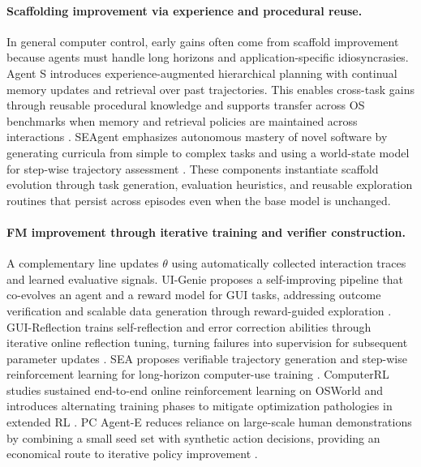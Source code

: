 \documentclass{article}
\begin{document}
\paragraph{Scaffolding improvement via experience and procedural reuse.}
In general computer control, early gains often come from scaffold improvement because agents must handle long horizons and application-specific idiosyncrasies. Agent S introduces experience-augmented hierarchical planning with continual memory updates and retrieval over past trajectories. This enables cross-task gains through reusable procedural knowledge and supports transfer across OS benchmarks when memory and retrieval policies are maintained across interactions \citep{agashe2024agentsopenagentic}. SEAgent emphasizes autonomous mastery of novel software by generating curricula from simple to complex tasks and using a world-state model for step-wise trajectory assessment \citep{sun2025seagentselfevolvingcomputeruse}. These components instantiate scaffold evolution through task generation, evaluation heuristics, and reusable exploration routines that persist across episodes even when the base model is unchanged.

\paragraph{FM improvement through iterative training and verifier construction.}
A complementary line updates $\theta$ using automatically collected interaction traces and learned evaluative signals. UI-Genie proposes a self-improving pipeline that co-evolves an agent and a reward model for GUI tasks, addressing outcome verification and scalable data generation through reward-guided exploration \citep{xiao2025uigenie}. GUI-Reflection trains self-reflection and error correction abilities through iterative online reflection tuning, turning failures into supervision for subsequent parameter updates \citep{wu2025guireflectionempoweringmultimodalgui}. SEA proposes verifiable trajectory generation and step-wise reinforcement learning for long-horizon computer-use training \citep{cheng2026evolvingtasksempoweringmultimodality}. ComputerRL studies sustained end-to-end online reinforcement learning on OSWorld and introduces alternating training phases to mitigate optimization pathologies in extended RL \citep{lai2026computerrl}. PC Agent-E reduces reliance on large-scale human demonstrations by combining a small seed set with synthetic action decisions, providing an economical route to iterative policy improvement \citep{he2026efficient}.
\end{document}
